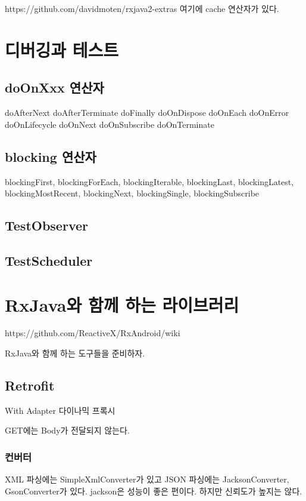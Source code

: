 \documentclass{book}
\begin{document}
{https://github.com/davidmoten/rxjava2-extras
여기에 cache 연산자가 있다.



\chapter{디버깅과 테스트}	
\section{doOnXxx 연산자}
doAfterNext
doAfterTerminate
doFinally
doOnDispose
doOnEach
doOnError
doOnLifecycle
doOnNext
doOnSubscribe
doOnTerminate

\section{blocking 연산자}
blockingFirst,
blockingForEach,
blockingIterable,
blockingLast,
blockingLatest,
blockingMostRecent,
blockingNext,
blockingSingle,
blockingSubscribe

\section{TestObserver}

\section{TestScheduler}

\chapter{RxJava와 함께 하는 라이브러리}
https://github.com/ReactiveX/RxAndroid/wiki

RxJava와 함께 하는 도구들을 준비하자. 


\section{Retrofit}
With Adapter
다이나믹 프록시

GET에는 Body가 전달되지 않는다. 

\subsection{컨버터}
XML 파싱에는 SimpleXmlConverter가 있고 JSON 파싱에는 JacksonConverter, GsonConverter가 있다.
jackson은 성능이 좋은 편이다. 하지만 신뢰도가 높지는 않다.

}
\end{document}
